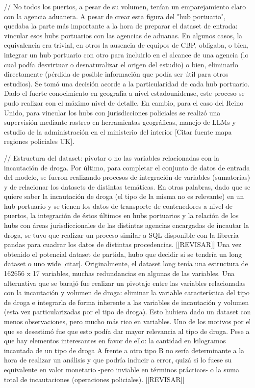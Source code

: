 \documentclass{article}
\begin{document}
// No todos los puertos, a pesar de su volumen, tenían un emparejamiento claro con la agencia aduanera.
A pesar de crear esta figura del "hub portuario", quedaba la parte más importante a la hora de preparar el dataset de entrada: vincular esos hubs portuarios con las agencias de aduanas. En algunos casos, la equivalencia era trivial, en otros la ausencia de equipos de CBP, obligaba, o bien, integrar un hub portuario con otro para incluirlo en el alcance de una agencia (lo cual podía desvirtuar o desnaturalizar el origen del estudio) o bien, eliminarlo directamente (pérdida de posible información que podía ser útil para otros estudios). Se tomó una decisión acorde a la particularidad de cada hub portuario. Dado el fuerte conocimiento en geografía a nivel estadounidense, este proceso se pudo realizar con el máximo nivel de detalle. En cambio, para el caso del Reino Unido, para vincular los hubs con jurisdicciones policiales se realizó una supervisión mediante rastreo en herramientas geográficas, manejo de LLMs y estudio de la administración en el ministerio del interior [Citar fuente mapa regiones policiales UK].

// Estructura del dataset: pivotar o no las variables relacionadas con la incautación de droga.
Por último, para completar el conjunto de datos de entrada del modelo, se fueron realizando procesos de integración de variables (sumatorias) y de relacionar los datasets de distintas temáticas. En otras palabras, dado que se quiere saber la incautación de droga (el tipo de la misma no es relevante) en un hub portuario y se tienen los datos de transporte de contenedores a nivel de puertos, la integración de éstos últimos en hubs portuarios y la relación de los hubs con áreas jurisdiccionales de las distintas agencias encargadas de incautar la droga, se tuvo que realizar un proceso similar a SQL disponible con la librería pandas para cuadrar los datos de distintas procedencias.
[[REVISAR]]
Una vez obtenido el potencial dataset de partida, hubo que decidir si se tendría un long dataset o uno wide [citar]. Originalmente, el dataset long tenía una estructura de 162656 x 17 variables, muchas redundancias en algunas de las variables. Una alternativa que se barajó fue realizar un pivotaje entre las variables relacionadas con la incautación y volumen de droga: eliminar la variable característica del tipo de droga e integrarla de forma inherente a las variables de incautación y volumen (esta vez particularizadas por el tipo de droga). Esto hubiera dado un dataset con menos observaciones, pero mucho más rico en variables. Uno de los motivos por el que se desestimó fue que esto podía dar mayor relevancia al tipo de droga. Pese a que hay elementos interesantes en favor de ello: la cantidad en kilogramos incautada de un tipo de droga A frente a otro tipo B no sería determinante a la hora de realizar un análisis y que podría inducir a error, quizá si lo fuese su equivalente en valor monetario -pero inviable en términos prácticos- o la suma total de incautaciones (operaciones policiales). [[REVISAR]]
\end{document}
